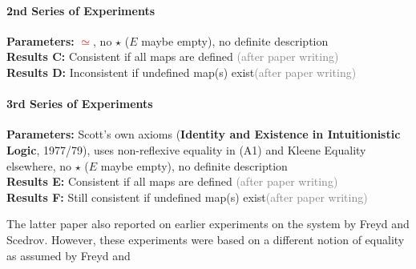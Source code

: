\documentclass{article}
\begin{document}
\paragraph{2nd Series of Experiments}
\textbf{Parameters:} \textcolor{red}{$\simeq$}, no $\star$ ($E$ maybe
empty), no definite
description \\
\textbf{Results C:} Consistent if all maps are defined \hfill \textcolor{gray}{(after paper writing)} \\
\textbf{Results D:} Inconsistent if undefined map(s) exist\hfill \textcolor{gray}{(after paper writing)}


\paragraph{3rd Series of Experiments}
\textbf{Parameters:} Scott's own axioms (\textbf{Identity
and Existence in Intuitionistic Logic}, 1977/79), uses 
non-reflexive equality in (A1) and Kleene Equality elsewhere, no $\star$ ($E$ maybe
empty), no definite
description 
\\
\textbf{Results E:} Consistent if all maps are defined \hfill \textcolor{gray}{(after paper writing)} \\
\textbf{Results F:} Still consistent if undefined map(s) exist\hfill \textcolor{gray}{(after paper writing)}




The latter paper also reported on 
earlier experiments on the system by Freyd and Scedrov. However, these experiments were based on a different notion of equality as assumed by Freyd and 
\end{document}
